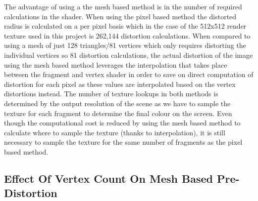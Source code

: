 \documentclass[]{article}
\begin{document}
The advantage of using a the mesh based method is in the number of required calculations in the shader. When using the pixel based method the distorted radius is calculated on a per pixel basis which in the case of the 512x512 render texture used in this project is 262,144 distortion calculations. When compared to using a mesh of just 128 triangles/81 vertices which only requires distorting the individual vertices so 81 distortion calculations, the actual distortion of the image using the mesh based method leverages the interpolation that takes place between the fragment and vertex shader in order to save on direct computation of distortion for each pixel as these values are interpolated based on the vertex distortions instead. The number of texture lookups in both methods is determined by the output resolution of the scene as we have to sample the texture for each fragment to determine the final colour on the screen. Even though the computational cost is reduced by using the mesh based method to calculate where to sample the texture (thanks to interpolation), it is still necessary to sample the texture for the same number of fragments as the pixel based method.
\subsection{Effect Of Vertex Count On Mesh Based Pre-Distortion}



\end{document}
